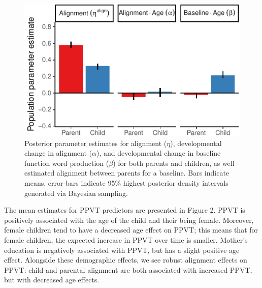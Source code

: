 \documentclass[10pt, letterpaper]{article}
\newenvironment{CodeChunk}{}{}
\begin{document}
\begin{CodeChunk}
\begin{figure}[tb]
\includegraphics{figs/parameters_plot-1} \caption[Posterior parameter estimates for alignment ($\eta$), developmental change in alignment ($\alpha$), and developmental change in baseline function word production ($\beta$) for both parents and children, as well estimated alignment between parents for a baseline]{Posterior parameter estimates for alignment ($\eta$), developmental change in alignment ($\alpha$), and developmental change in baseline function word production ($\beta$) for both parents and children, as well estimated alignment between parents for a baseline. Bars indicate means, error-bars indicate 95\% highest posterior density intervals generated via Bayesian sampling.}\label{fig:parameters_plot}
\end{figure}
\end{CodeChunk}

The mean estimates for PPVT predictors are presented in Figure 2. PPVT
is positively associated with the age of the child and their being
female. Moreover, female children tend to have a decreased age effect on
PPVT; this means that for female children, the expected increase in PPVT
over time is smaller. Mother's education is negatively associated with
PPVT, but has a slight positive age effect. Alongside these demographic
effects, we see robust alignment effects on PPVT: child and parental
alignment are both associated with increased PPVT, but with decreased
age effects.
\end{document}
